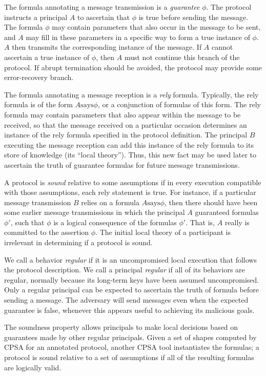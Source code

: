 \documentclass[titlepage,12pt]{article}
\theoremstyle{definition}
\newcommand{\says}{\mathbin{\mathrm{says}}}
\begin{document}
The formula annotating a message transmission is a \emph{guarantee}
$\phi$.  The protocol instructs a principal $A$ to ascertain that
$\phi$ is true before sending the message.  The formula $\phi$ may
contain parameters that also occur in the message to be sent, and $A$
may fill in these parameters in a specific way to form a true instance
of $\phi$.  $A$ then transmits the corresponding instance of the
message.  If $A$ cannot ascertain a true instance of $\phi$, then $A$
must not continue this branch of the protocol.  If abrupt termination
should be avoided, the protocol may provide some error-recovery
branch.

The formula annotating a message reception is a \emph{rely} formula.
Typically, the rely formula is of the form $A\says\phi$,
or a conjunction of formulas of this form.  The rely formula may
contain parameters that also appear within the message to be received,
so that the message received on a particular occasion determines an
instance of the rely formula specified in the protocol definition.
The principal $B$ executing the message reception can add this
instance of the rely formula to its store of knowledge (its ``local
theory'').  Thus, this new fact may be used later to ascertain the
truth of guarantee formulas for future message transmissions.

A protocol is \emph{sound} relative to some assumptions if in every
execution compatible with those assumptions, each rely statement is
true.  For instance, if a particular message transmission $B$
relies on a formula $A\says\phi$, then there should have been some
earlier message transmissions in which the principal $A$ guaranteed
formulas $\phi'$, such that $\phi$ is a logical consequence of the
formulas $\phi'$.  That is, $A$ really is committed to the assertion
$\phi$.  The initial local theory of a participant is irrelevant
in determining if a protocol is sound.

We call a behavior \emph{regular} if it is an uncompromised local
execution that follows the protocol description.  We call a principal
\emph{regular} if all of its behaviors are regular, normally because
its long-term keys have been assumed uncompromised.  Only a regular
principal can be expected to ascertain the truth of formula before
sending a message.  The adversary will send messages even when the
expected guarantee is false, whenever this appears useful to achieving
its malicious goals.

The soundness property allows principals to make local decisions based
on guarantees made by other regular principals.  Given a set of shapes
computed by CPSA for an annotated protocol, another CPSA tool
instantiates the formulas; a protocol is sound relative to a set of
assumptions if all of the resulting formulas are logically valid.
\end{document}
